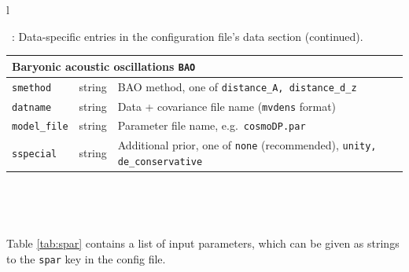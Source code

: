 \documentclass[11pt, chapterprefix, headsepline]{scrartcl}
\begin{document}
\begin{longtable}{l}
\begin{minipage}{\textwidth}
  \centerline{\tablename\ \thetable{}: Data-specific entries in the configuration file's data
  section (continued).}%
 \begin{tabularx}{\textwidth}{llX}
     \\
    \hline \multicolumn{3}{l}{\rul Baryonic acoustic oscillations
      \quad \texttt{BAO}} \\ \hline
    \texttt{smethod} & string & BAO method, one of
    \texttt{distance\_A, distance\_d\_z} \\
    \texttt{datname} & string & Data + covariance file name (\texttt{mvdens} format) \\
    \texttt{model\_file}   & string & Parameter file name, e.g.~\texttt{cosmoDP.par} \\
    \texttt{sspecial}   & string & Additional prior, one of
    \texttt{none} (recommended), \texttt{unity, de\_conservative} \\
    \hline
    \end{tabularx}
    \\
\end{minipage}
\\

\vspace*{1em}
 

\end{longtable}



Table \ref{tab:spar} contains a list of input parameters, which can be
given as strings to the \texttt{spar} key in the config file.

\end{document}
